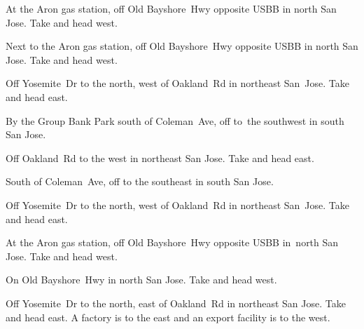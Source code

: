 
\begin{LocationList}

At the Aron gas station, off Old Bayshore~Hwy opposite USBB in north San Jose.
Take   and head west.

Next to the Aron gas station, off Old Bayshore~Hwy opposite USBB in north San Jose.
Take   and head west.

Off Yosemite~Dr to the north, west of Oakland~Rd in northeast San~Jose.
Take   and head east.

By the Group Bank Park south of Coleman~Ave, off   to~the southwest in south San Jose.

Off Oakland~Rd to the west in northeast San Jose.
Take   and head east.

South of Coleman~Ave, off   to the southeast in south San Jose.

Off Yosemite~Dr to the north, west of Oakland~Rd in northeast San~Jose.
Take   and head east.

\Location{\TruckService \Rest \Service}
At the Aron gas station, off Old Bayshore~Hwy opposite USBB in~north San Jose.
Take   and head west.

On Old Bayshore~Hwy in north San Jose.
Take   and head west.

Off Yosemite~Dr to the north, east of Oakland~Rd in northeast San Jose.
Take   and head east.
A factory is to the east and an export facility is to the west.

\end{LocationList}
